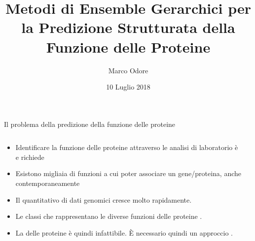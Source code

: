 \documentclass[9pt]{beamer}
\author{Marco Odore}
\title[Metodi di Ensemble Gerarchici]{Metodi di Ensemble Gerarchici per la Predizione Strutturata della Funzione delle Proteine}
\date{10 Luglio 2018}
\begin{document}
\titlepageframe
\begin{tframe}{Il problema della predizione della funzione delle proteine}
  \begin{columns}
    \begin{column}{.65\textwidth}
      \minipage[c][0.4\textheight][s]{\columnwidth}
	   \begin{itemize}	
	  \item Identificare la funzione delle proteine attraverso le analisi di laboratorio è  e richiede 
	  \onslide<2->
	  \item Esistono migliaia di funzioni a cui poter associare un gene/proteina, anche contemporaneamente 
	  \item Il quantitativo di dati genomici cresce molto rapidamente.
      \item Le classi che rappresentano le diverse funzioni delle proteine .
	  \onslide<5->
	  \item La  delle proteine è quindi infattibile. È necessario quindi un approccio .
	  \end{itemize}
      \endminipage      
    \end{column}
    \begin{column}{.35\textwidth}
    \end{column}
  \end{columns}
\end{tframe}
\end{document}
